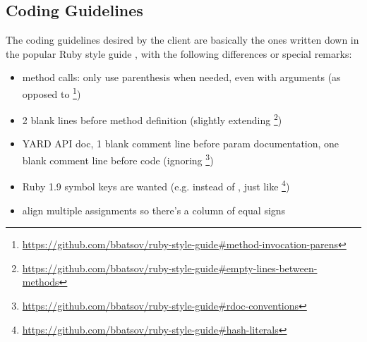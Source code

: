 \subsection{Coding Guidelines}
The coding guidelines desired by the client are basically the ones written down
in the popular Ruby style guide \cite{rb:style-guide}, with the following
differences or special remarks:

\begin{itemize}
	\item method calls: only use parenthesis when needed, even with arguments (as opposed to \footnote{\url{https://github.com/bbatsov/ruby-style-guide\#method-invocation-parens}})
	\item 2 blank lines before method definition (slightly extending \footnote{\url{https://github.com/bbatsov/ruby-style-guide\#empty-lines-between-methods}})
	\item YARD API doc, 1 blank comment line before param documentation, one blank comment line before code (ignoring \footnote{\url{https://github.com/bbatsov/ruby-style-guide\#rdoc-conventions}})
	\item Ruby 1.9 symbol keys are wanted (e.g.  instead of , just like \footnote{\url{https://github.com/bbatsov/ruby-style-guide\#hash-literals}})
	\item align multiple assignments so there's a column of equal signs
\end{itemize}
